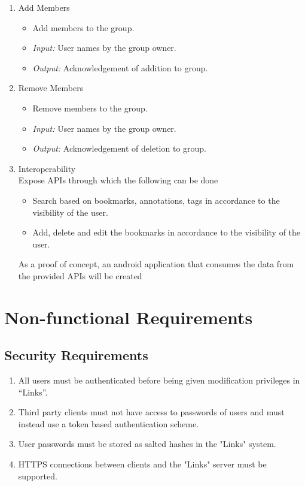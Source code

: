 \documentclass[11pt]{report} %
\begin{document}
\begin{enumerate}
	\item
		Add Members
		\begin{itemize}
			\item
				Add members to the group.
			\item
				\emph{Input:} User names by the group owner.
			\item
				\emph{Output:} Acknowledgement of addition to group.
		\end{itemize}


	\item
		Remove Members
		\begin{itemize}
			\item
				Remove members to the group.
			\item
				\emph{Input:} User names by the group owner.
			\item
				\emph{Output:} Acknowledgement of deletion to group.
		\end{itemize}
\item
Interoperability\\
Expose APIs through which the following can be done
\begin{itemize}
\item
Search based on bookmarks, annotations, tags in accordance to the visibility of the user.
\item
Add, delete and edit the bookmarks in accordance to the visibility of the user.
\end{itemize}
As a proof of concept, an android application that consumes the data from the provided APIs will be created
\end{enumerate}
\maketitle
\section{Non-functional Requirements}
\subsection{Security Requirements}
\begin{enumerate}
\item
All users must be authenticated before being given modification privileges in “Links”.
\item
Third party clients must not have access to passwords of users and must instead use a token based authentication scheme.
\item
User passwords must be stored as salted hashes in the "Links" system.
\item
HTTPS connections between clients and the "Links" server must be supported.
\end{enumerate}
\end{document}
